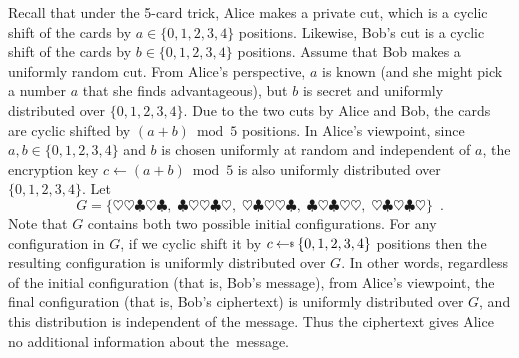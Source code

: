 \documentclass[twoside]{article}
\newcommand{\getsr}{{\:{\leftarrow{\hspace*{-3pt}\raisebox{.75pt}{$\scriptscriptstyle\$$}}}\:}}
\begin{document}
\begin{itemize}
Recall that under the 5-card trick, Alice makes a private cut, which is a cyclic shift of the cards by $a \in \{0, 1, 2, 3, 4\}$ positions. 
Likewise, Bob's cut is a cyclic shift of the cards by $b \in \{0, 1, 2, 3, 4\}$ positions. 
Assume that Bob makes a uniformly random cut. %
From Alice's perspective, $a$ is known (and she might pick a number $a$ that she finds advantageous), 
but $b$ is secret and  uniformly distributed over $\{0, 1, 2, 3, 4\}$. 
Due to the two cuts by Alice and Bob, the cards are cyclic shifted by $(a + b) \bmod 5$ positions. 
In Alice's viewpoint, since $a, b \in \{0, 1, 2, 3, 4\}$ and $b$ is chosen uniformly at random and independent of $a$, 
the encryption key $c \gets (a + b) \bmod 5$ is also uniformly distributed over $\{0, 1, 2, 3, 4\}$. 
Let
\[ G = \{ \heartsuit \heartsuit \clubsuit \heartsuit \clubsuit, \; \clubsuit \heartsuit \heartsuit \clubsuit \heartsuit, \;
                    \heartsuit \clubsuit \heartsuit \heartsuit \clubsuit, \;
                    \clubsuit \heartsuit \clubsuit \heartsuit \heartsuit, \;
                    \heartsuit \clubsuit \heartsuit \clubsuit \heartsuit \} \enspace. 
	\]
	Note that $G$ contains both two possible initial configurations. 
For any configuration in $G$, if we cyclic shift it by $c \getsr \{0, 1, 2, 3, 4\}$ positions
then the resulting configuration is uniformly distributed over $G$. 
In other words, regardless of the initial configuration (that is, Bob's message),  from Alice's viewpoint, the final configuration (that is, Bob's ciphertext)
is uniformly distributed over $G$, and this distribution is independent of the message. 
Thus the ciphertext gives Alice no additional information about the~message. 









\end{itemize}
\end{document}
